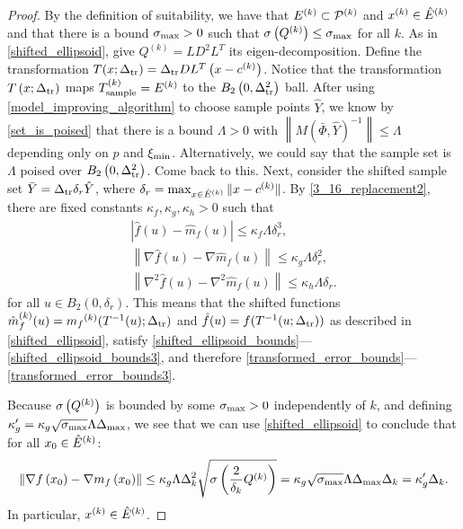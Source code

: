 \documentclass{article}
\begin{document}
\begin{proof}

By the definition of suitability, we have that ${E^{(k)}} \subset {{\mathcal{P}}^{(k)}}$ and $x^{(k)} \in {{\hat E}^{(k)}}$ and that there is a bound $\sigma_{\textrm{max}} > 0$ such that ${\sigma}\left(Q^{(k)}\right)\le \sigma_{\textrm{max}}$ for all $k$.
As in \cref{shifted_ellipsoid},  give $Q^{(k)} = LD^2L^T$ its eigen-decomposition.
Define the transformation $T(x; \Delta_{\textrm{tr}}) = \Delta_{\textrm{tr}} D L^T\left(x - c^{(k)}\right)$.
Notice that
the transformation $T\left(x; \Delta_{\textrm{tr}}\right)$ maps ${T_{\text{sample}}^{(k)}} = {E^{(k)}}$ to the $B_2\left(0, \Delta_{\textrm{tr}}^2\right)$ ball.
After using \cref{model_improving_algorithm} to choose sample points $\hat Y$, we know by \cref{set_is_poised}
that there is a bound $\Lambda>0$ with $\left\| M\left(\bar \Phi, \hat Y\right)^{-1}\right\| \le \Lambda$ depending only on $p$ and $\xi_{\text{min}}$.
\color{magenta}
Alternatively, we could say that the sample set is $\Lambda$ poised over $B_2\left(0, \Delta_{\textrm{tr}}^2\right)$.
Come back to this.
\color{black}
Next,  consider the shifted sample set $\bar Y = \Delta_{\textrm{tr}} \delta_r \hat Y$, where $\delta_r = \max_{x \in {{\hat E}^{(k)}}}\|x - c^{(k)}\|$.
By \cref{3_16_replacement2},  there are fixed constants $\kappa_f, \kappa_g, \kappa_h > 0$ such that
\begin{align*}
\left| \hat {f}\left(u\right) - \hat{m}_f\left(u\right) \right|\le \kappa_f\Lambda \delta_r^3, \\
\left\|\nabla \hat {f}\left(u\right) - \nabla \hat{m}_f\left(u\right) \right\|\le \kappa_g\Lambda \delta_r^2, \\
\left\|\nabla^2 \hat {f}\left(u\right) - \nabla^2 \hat{m}_f\left(u\right) \right\|\le \kappa_h\Lambda \delta_r.
\end{align*}
for all $u \in B_2\left(0, \delta_r\right)$.
This means that the shifted functions
$\hat {m}_f^{(k)}(u) = {{m}_f}^{(k)}(T^{-1}(u); \Delta_{\textrm{tr}})$ and
$\hat f (u) = f(T^{-1}(u; \Delta_{\textrm{tr}}))$
as described in \cref{shifted_ellipsoid},
satisfy \cref{shifted_ellipsoid_bounds}---\cref{shifted_ellipsoid_bounds3},
and therefore \cref{transformed_error_bounds}---\cref{transformed_error_bounds3}.


Because ${\sigma} \left({Q^{(k)}}\right)$ is bounded by some $\sigma_{\textrm{max}} > 0$ independently of $k$,
and defining $\kappa'_{g} =  \kappa_g\sqrt{\sigma_{\textrm{max}}}\Lambda{\Delta_{\textrm{max}}}$, we see that
we can use  \cref{shifted_ellipsoid} to conclude that for all $x_0 \in {{\hat E}^{(k)}}$:
\begin{align*}
\left\|\nabla f\left(x_0 \right) - \nabla m_f\left(x_0\right)\right\| \le 
\kappa_g  \Lambda\Delta_k^2 \sqrt{{\sigma} \left(\frac 2 {\delta_k} Q^{(k)}\right)}
=  \kappa_g \sqrt{\sigma_{\textrm{max}}}\Lambda{\Delta_{\textrm{max}}}\Delta_k
= \kappa'_g\Delta_k.
\end{align*}
In particular, $x^{(k)} \in {{\hat E}^{(k)}}$.
\end{proof}
\end{document}
